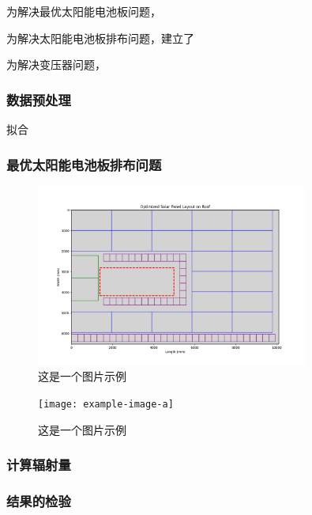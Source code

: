 \documentclass{ctexart}
\begin{document}
    为解决最优太阳能电池板问题，

    为解决太阳能电池板排布问题，建立了

    为解决变压器问题，
    

    
    \subsubsection{数据预处理}
    拟合
    \subsubsection{最优太阳能电池板排布问题}

    \begin{figure}[H] %
        \centering %
        \includegraphics[width=0.8\textwidth]{"south_top_B2_21_C1_2_C6_63.png"
} %
        \caption{这是一个图片示例} %
        \label{fig:example} %
    \end{figure}

    \begin{figure}[H] %
        \centering %
        \texttt{[image: example-image-a]} %
        \caption{这是一个图片示例} %
        \label{fig:example} %
    \end{figure}

    \subsubsection{计算辐射量}
    
    \subsubsection{结果的检验}
\end{document}
